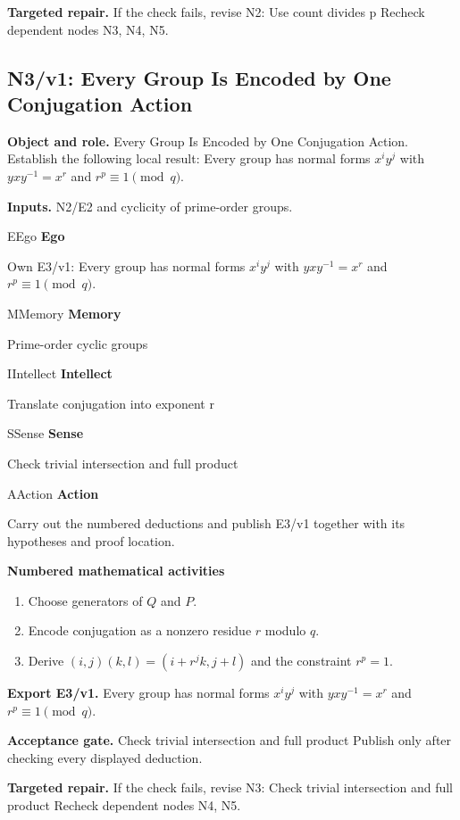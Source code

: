\documentclass[preprint,12pt,aps,pra,showkeys,amsmath,amssymb,superscriptaddress,floatfix]{revtex4-2}
\theoremstyle{definition}
\theoremstyle{remark}
\newcommand{\mmfaculty}[3]{%
 \begin{mmfacultybox}{#1}{#2}
 {\sffamily\bfseries\color{MMBlue}#2}\par\smallskip #3
 \end{mmfacultybox}}
\newcommand{\field}[2]{\par\smallskip\noindent\textbf{#1.} #2\par}
\begin{document}
\field{Targeted repair}{If the check fails, revise N2: Use count divides p Recheck dependent
nodes N3, N4, N5.}

\clearpage

\subsection{N3/v1: Every Group Is Encoded by One Conjugation Action}

\field{Object and role}{Every Group Is Encoded by One Conjugation Action. Establish the
following local result: Every group has normal forms \(x^iy^j\) with
\(yxy^{-1}=x^r\) and \(r^p\equiv1\pmod q\).}

\field{Inputs}{N2/E2 and cyclicity of prime-order groups.}

\mmfaculty{E}{Ego}{Own E3/v1: Every group has normal forms \(x^iy^j\) with \(yxy^{-1}=x^r\)
and \(r^p\equiv1\pmod q\).}

\mmfaculty{M}{Memory}{Prime-order cyclic groups}

\mmfaculty{I}{Intellect}{Translate conjugation into exponent r}

\mmfaculty{S}{Sense}{Check trivial intersection and full product}

\mmfaculty{A}{Action}{Carry out the numbered deductions and publish E3/v1 together with its
hypotheses and proof location.}

\smallskip\noindent\textbf{Numbered mathematical activities}

\begin{enumerate}[label=N3.\arabic*,leftmargin=3.4em]

\item Choose generators of \(Q\) and \(P\).

\item Encode conjugation as a nonzero residue \(r\) modulo \(q\).

\item Derive \((i,j)(k,l)=(i+r^jk,j+l)\) and the constraint \(r^p=1\).

\end{enumerate}

\field{Export E3/v1}{Every group has normal forms \(x^iy^j\) with \(yxy^{-1}=x^r\) and
\(r^p\equiv1\pmod q\).}

\field{Acceptance gate}{Check trivial intersection and full product Publish only after checking
every displayed deduction.}

\field{Targeted repair}{If the check fails, revise N3: Check trivial intersection and full
product Recheck dependent nodes N4, N5.}
\end{document}

